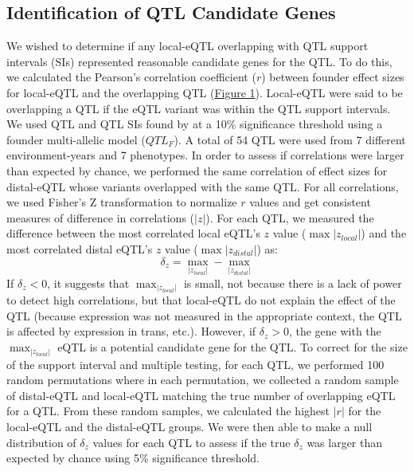 \documentclass[article,9pt,twocolumn,twoside]{rilabRxiv}
\begin{document}
\subsection{Identification of QTL Candidate Genes}
We wished to determine if any local-eQTL overlapping with QTL support intervals (SIs) represented reasonable candidate genes for the QTL.
To do this, we calculated the Pearson's correlation coefficient ($r$) between founder effect sizes for local-eQTL and the overlapping QTL (\hyperref[fig:scenarios]{Figure 1}).
Local-eQTL were said to be overlapping a QTL if the eQTL variant was within the QTL support intervals.
We used QTL and QTL SIs found by \cite{Odell} at a 10\% significance threshold using a founder multi-allelic model ($QTL_F$).
A total of 54 QTL were used from 7 different environment-years and 7 phenotypes.
In order to assess if correlations were larger than expected by chance, we performed the same correlation of effect sizes for distal-eQTL whose variants overlapped with the same QTL.
For all correlations, we used Fisher's Z transformation to normalize $r$ values and get consistent measures of difference in correlations ($|z|$).
For each QTL, we measured the difference between the most correlated local eQTL's $z$ value ($\max {|z_{local}|}$) and the most correlated distal eQTL's $z$ value ($\max {|z_{distal}|}$) as:
    \begin{equation}
    \label{eqn:zdiff}
    \delta_{z} = \max_{|z_{local}|} - \max_{|z_{distal}|}
    \end{equation}
If $\delta_{z} < 0$, it suggests that $\max_{|z_{local}|}$ is small, not because there is a lack of power to detect high correlations, but that local-eQTL do not explain the effect of the QTL (because expression was not measured in the appropriate context, the QTL is affected by expression in trans, etc.).
However, if $\delta_{z} > 0$, the gene with the $\max_{|z_{local}|}$ eQTL is a potential candidate gene for the QTL.
To correct for the size of the support interval and multiple testing, for each QTL, we performed 100 random permutations where in each permutation, we collected a random sample of distal-eQTL and local-eQTL matching the true number of overlapping eQTL for a QTL.
From these random samples, we calculated the highest $|r|$ for the local-eQTL and the distal-eQTL groups.
We were then able to make a null distribution of $\delta_{z}$ values for each QTL to assess if the true $\delta_{z}$ was larger than expected by chance using 5\% significance threshold.
\end{document}
